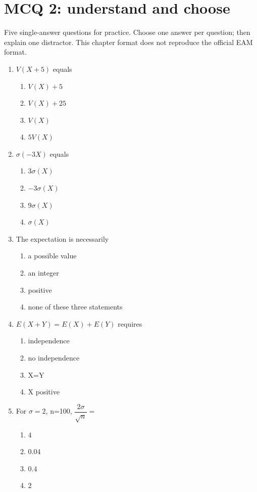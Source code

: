 \endgroup
\begingroup\small
{}\section*{MCQ 2: understand and choose}\label{C08-Q2}
Five single-answer questions for practice. Choose one answer per question; then explain one distractor. This chapter format does not reproduce the official EAM format.
\begin{enumerate}
\item $V(X+5)$ equals
\begin{enumerate}[label=\Alph*.,itemsep=2pt]
\item $V(X)+5$
\item $V(X)+25$
\item $V(X)$
\item $5V(X)$
\end{enumerate}
\item $\sigma(-3X)$ equals
\begin{enumerate}[label=\Alph*.,itemsep=2pt]
\item $3\sigma(X)$
\item $-3\sigma(X)$
\item $9\sigma(X)$
\item $\sigma(X)$
\end{enumerate}
\item The expectation is necessarily
\begin{enumerate}[label=\Alph*.,itemsep=2pt]
\item a possible value
\item an integer
\item positive
\item none of these three statements
\end{enumerate}
\item $E(X+Y)=E(X)+E(Y)$ requires
\begin{enumerate}[label=\Alph*.,itemsep=2pt]
\item independence
\item no independence
\item X=Y
\item X positive
\end{enumerate}
\item For $\sigma=2$, n=100, $\dfrac{2\sigma}{\sqrt n}=$
\begin{enumerate}[label=\Alph*.,itemsep=2pt]
\item $4$
\item $0.04$
\item $0.4$
\item $2$
\end{enumerate}
\end{enumerate}
